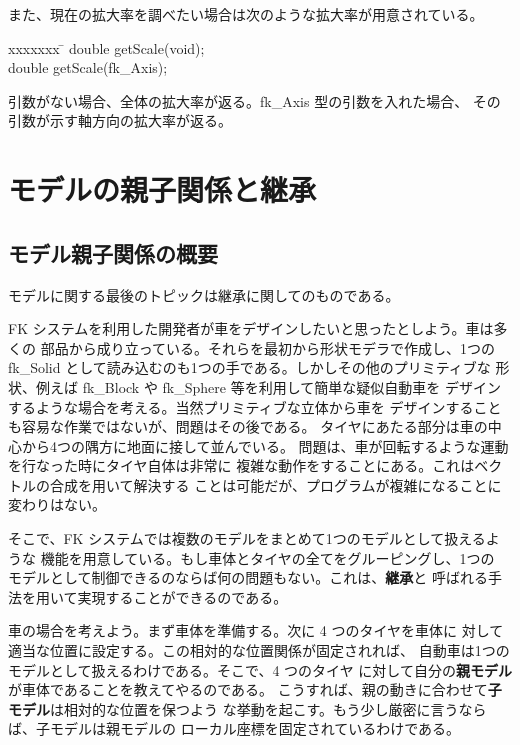 また、現在の拡大率を調べたい場合は次のような拡大率が用意されている。
\begin{bf}
\begin{tabbing}
xxxxxxx \= \kill
\> double getScale(void); \\
\> double getScale(fk\_Axis); \\
\end{tabbing}
\end{bf}
引数がない場合、全体の拡大率が返る。fk\_Axis 型の引数を入れた場合、
その引数が示す軸方向の拡大率が返る。

\section{モデルの親子関係と継承}
\subsection{モデル親子関係の概要}
モデルに関する最後のトピックは継承に関してのものである。

FK システムを利用した開発者が車をデザインしたいと思ったとしよう。車は多くの
部品から成り立っている。それらを最初から形状モデラで作成し、1つの
fk\_Solid として読み込むのも1つの手である。しかしその他のプリミティブな
形状、例えば fk\_Block や fk\_Sphere 等を利用して簡単な疑似自動車を
デザインするような場合を考える。当然プリミティブな立体から車を
デザインすることも容易な作業ではないが、問題はその後である。
タイヤにあたる部分は車の中心から4つの隅方に地面に接して並んでいる。
問題は、車が回転するような運動を行なった時にタイヤ自体は非常に
複雑な動作をすることにある。これはベクトルの合成を用いて解決する
ことは可能だが、プログラムが複雑になることに変わりはない。

そこで、FK システムでは複数のモデルをまとめて1つのモデルとして扱えるような
機能を用意している。もし車体とタイヤの全てをグルーピングし、1つの
モデルとして制御できるのならば何の問題もない。これは、\textbf{継承}と
呼ばれる手法を用いて実現することができるのである。

車の場合を考えよう。まず車体を準備する。次に 4 つのタイヤを車体に
対して適当な位置に設定する。この相対的な位置関係が固定されれば、
自動車は1つのモデルとして扱えるわけである。そこで、4 つのタイヤ
に対して自分の\textbf{親モデル}が車体であることを教えてやるのである。
こうすれば、親の動きに合わせて\textbf{子モデル}は相対的な位置を保つよう
な挙動を起こす。もう少し厳密に言うならば、子モデルは親モデルの
ローカル座標を固定されているわけである。

